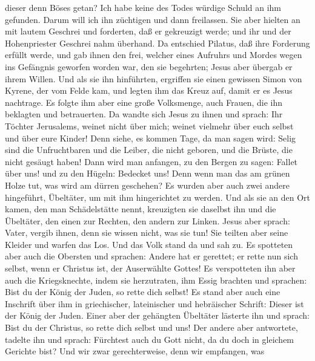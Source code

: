 dieser denn Böses getan? Ich habe keine des Todes würdige Schuld an ihm
gefunden. Darum will ich ihn züchtigen und dann freilassen.
 Sie aber hielten an mit lautem Geschrei und forderten,
daß er gekreuzigt werde; und ihr und der Hohenpriester Geschrei nahm
überhand.  Da entschied Pilatus, daß ihre Forderung
erfüllt werde,  und gab ihnen den frei, welcher eines
Aufruhrs und Mordes wegen ins Gefängnis geworfen worden war, den sie
begehrten; Jesus aber übergab er ihrem Willen.  Und als
sie ihn hinführten, ergriffen sie einen gewissen Simon von Kyrene, der
vom Felde kam, und legten ihm das Kreuz auf, damit er es Jesus
nachtrage.  Es folgte ihm aber eine große Volksmenge,
auch Frauen, die ihn beklagten und betrauerten.  Da
wandte sich Jesus zu ihnen und sprach: Ihr Töchter Jerusalems, weinet
nicht über mich; weinet vielmehr über euch selbst und über eure Kinder!
 Denn siehe, es kommen Tage, da man sagen wird: Selig
sind die Unfruchtbaren und die Leiber, die nicht geboren, und die
Brüste, die nicht gesäugt haben!  Dann wird man anfangen,
zu den Bergen zu sagen: Fallet über uns! und zu den Hügeln: Bedecket
uns!  Denn wenn man das am grünen Holze tut, was wird am
dürren geschehen?  Es wurden aber auch zwei andere
hingeführt, Übeltäter, um mit ihm hingerichtet zu werden.
 Und als sie an den Ort kamen, den man Schädelstätte
nennt, kreuzigten sie daselbst ihn und die Übeltäter, den einen zur
Rechten, den andern zur Linken.  Jesus aber sprach:
Vater, vergib ihnen, denn sie wissen nicht, was sie tun! Sie teilten
aber seine Kleider und warfen das Los.  Und das Volk
stand da und sah zu. Es spotteten aber auch die Obersten und sprachen:
Andere hat er gerettet; er rette nun sich selbst, wenn er Christus ist,
der Auserwählte Gottes!  Es verspotteten ihn aber auch
die Kriegsknechte, indem sie herzutraten, ihm Essig brachten
 und sprachen: Bist du der König der Juden, so rette dich
selbst!  Es stand aber auch eine Inschrift über ihm in
griechischer, lateinischer und hebräischer Schrift: Dieser ist der König
der Juden.  Einer aber der gehängten Übeltäter lästerte
ihn und sprach: Bist du der Christus, so rette dich selbst und uns!
 Der andere aber antwortete, tadelte ihn und sprach:
Fürchtest auch du Gott nicht, da du doch in gleichem Gerichte bist?
 Und wir zwar gerechterweise, denn wir empfangen, was

